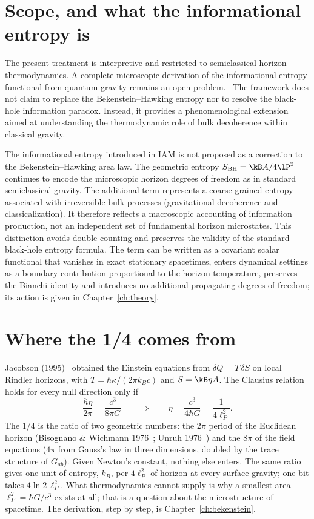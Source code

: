 \section{Scope, and what the informational entropy is}\label{sec:bh_scope}
The present treatment is interpretive and restricted to semiclassical horizon thermodynamics. A complete microscopic derivation of the informational
entropy functional from quantum gravity remains an open problem. \openprob\ The framework does not claim to replace the Bekenstein--Hawking entropy nor to
resolve the black-hole information paradox. Instead, it provides a phenomenological extension aimed at understanding the thermodynamic role of bulk
decoherence within classical gravity.

The informational entropy introduced in IAM is not proposed as a correction to the Bekenstein--Hawking area law. The geometric entropy $S_{\rm BH}=\kB A/4\lP^2$
continues to encode the microscopic horizon degrees of freedom as in standard semiclassical gravity. The additional term represents a coarse-grained entropy
associated with irreversible bulk processes (gravitational decoherence and classicalization). It therefore reflects a macroscopic accounting of
information production, not an independent set of fundamental horizon microstates. This distinction avoids double counting and preserves the validity of
the standard black-hole entropy formula. The term can be written as a covariant scalar functional that vanishes in exact stationary spacetimes, enters
dynamical settings as a boundary contribution proportional to the horizon temperature, preserves the Bianchi identity and introduces no additional
propagating degrees of freedom; its action is given in Chapter~\ref{ch:theory}. \interp

\section{Where the 1/4 comes from}\label{sec:bh_quarter}
Jacobson (1995)~\cite{Jacobson1995} obtained the Einstein equations from $\delta Q=T\,\delta S$ on local Rindler horizons, with $T=\hbar\kappa/(2\pi k_Bc)$ and $S=\kB\eta A$. The
Clausius relation holds for every null direction only if
\begin{equation}
\frac{\hbar\eta}{2\pi}=\frac{c^3}{8\pi G}\qquad\Longrightarrow\qquad\eta=\frac{c^3}{4\hbar G}=\frac{1}{4\ell_P^2}.
\end{equation}
The $1/4$ is the ratio of two geometric numbers: the $2\pi$ period of the Euclidean horizon (Bisognano \& Wichmann 1976~\cite{BisognanoWichmann1976}; Unruh 1976~\cite{Unruh1976}) and the $8\pi$ of the
field equations ($4\pi$ from Gauss's law in three dimensions, doubled by the trace structure of $G_{ab}$). Given Newton's constant, nothing else enters.
The same ratio gives one unit of entropy, $k_B$, per $4\ell_P^2$ of horizon at every surface gravity; one bit takes $4\ln2\,\ell_P^2$. What thermodynamics cannot supply is why a smallest area $\ell_P^2=\hbar G/c^3$
exists at all; that is a question about the microstructure of spacetime. The derivation, step by step, is Chapter~\ref{ch:bekenstein}. \derived

